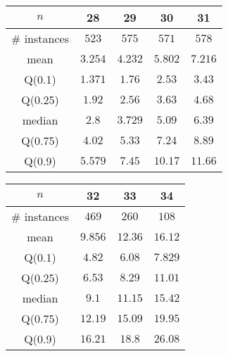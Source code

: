 \begin{tabular}{c|cccc} 
\hline 
$n$ & 28 & 29 & 30 & 31 \tabularnewline 
\hline 
\hline 
\# instances & $523$ & $575$ & $571$ & $578$ \tabularnewline 
mean & $3.254$ & $4.232$ & $5.802$ & $7.216$ \tabularnewline 
Q(0.1) & $1.371$ & $1.76$ & $2.53$ & $3.43$ \tabularnewline 
Q(0.25) & $1.92$ & $2.56$ & $3.63$ & $4.68$ \tabularnewline 
median & $2.8$ & $3.729$ & $5.09$ & $6.39$ \tabularnewline 
Q(0.75) & $4.02$ & $5.33$ & $7.24$ & $8.89$ \tabularnewline 
Q(0.9) & $5.579$ & $7.45$ & $10.17$ & $11.66$ \tabularnewline 
\hline 
\end{tabular} 
\medskip{} 

\begin{tabular}{c|ccc} 
\hline 
$n$ & 32 & 33 & 34 \tabularnewline 
\hline 
\hline 
\# instances & $469$ & $260$ & $108$ \tabularnewline 
mean & $9.856$ & $12.36$ & $16.12$ \tabularnewline 
Q(0.1) & $4.82$ & $6.08$ & $7.829$ \tabularnewline 
Q(0.25) & $6.53$ & $8.29$ & $11.01$ \tabularnewline 
median & $9.1$ & $11.15$ & $15.42$ \tabularnewline 
Q(0.75) & $12.19$ & $15.09$ & $19.95$ \tabularnewline 
Q(0.9) & $16.21$ & $18.8$ & $26.08$ \tabularnewline 
\hline 
\end{tabular} 
\medskip{} 

